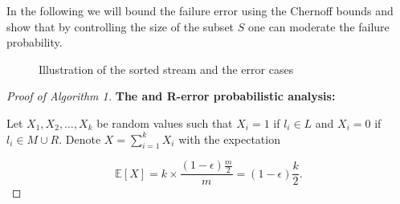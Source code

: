 \documentclass[10pt,usenames,dvipsnames]{article}
\newcommand{\Ebb}{\mathbb{E}}
\newenvironment{exercise}[2][Exercise]{\begin{trivlist}
  \item[\hskip \labelsep {\bfseries #1}\hskip \labelsep {\bfseries #2.}]}{\end{trivlist}}
\begin{document}
\begin{exercise}{1}
    In the following we will bound the failure error using the Chernoff bounds and show that by
    controlling the size of the subset $S$ one can moderate the failure probability.
    
    \begin{figure}
      \centering
      
      \caption{Illustration of the sorted stream and the error cases}
      \label{fig:figure1}
    \end{figure}


\begin{proof}[Proof of Algorithm 1]
\textbf{The \textbf{} and \textbf{\color{red} R-error}
probabilistic analysis:}

Let $X_1, X_2, \ldots, X_k$ be random values such that $X_i = 1$ if $l_i \in
L $ and $X_i = 0$ if $l_i \in M \cup R$. Denote $X = \sum_{i=1}^k X_i$ with the expectation

\begin{equation*}\Ebb\left[ X \right] = k \times\frac{(1 -
  \epsilon)\frac{m}{2}}{m} = (1 - \epsilon)\frac{k}{2}.
\end{equation*}


\end{proof}
\end{exercise}
\end{document}
